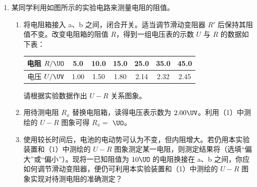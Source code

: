 \documentclass[\gkver]{gaokaozhenti}
\begin{document}
\begin{enumerate}


\item
某同学利用如图所示的实验电路来测量电阻的阻值。


\begin{enumerate}
	\item
	将电阻箱接入 a、b 之间，闭合开关。适当调节滑动变阻器 $R'$ 后保持其阻值不变。改变电阻箱的阻值 $R$，得到一组电压表的示数 $U$ 与 $R$ 的数据如下表：

	\begin{center}
	\begin{tabular}{|c|c|c|c|c|c|c|}
	\hline
	电阻 $R/\UO$ & 5.0 & 10.0 & 15.0 & 25.0 & 35.0 & 45.0 \\
	\hline
	电压 $U/\UV$ & 1.00 & 1.50 & 1.80 & 2.14 & 2.32 & 2.45 \\
	\hline
	\end{tabular}
	\end{center}

	请根据实验数据作出 $U-R$ 关系图象。

	\item
	用待测电阻 $R_{x}$ 替换电阻箱，读得电压表示数为 $2.00\UV$。利用（1）中测绘的 $U-R$ 图象可得 $R_{x}=$ $\UO$。
	\item
	使用较长时间后，电池的电动势可认为不变，但内阻增大。若仍用本实验装置和（1）中测绘的 $U-R$ 图象测定某一电阻，则测定结果将（选填“偏大”或“偏小”）。现将一已知阻值为 $10\UO$ 的电阻换接在 a、b 之间，你应如何调节滑动变阻器，便仍可利用本实验装置和（1）中测绘的 $U-R$ 图象实现对待测电阻的准确测定？
\end{enumerate}


\end{enumerate}
\end{document}
